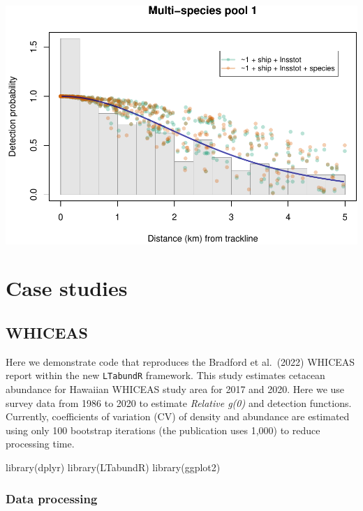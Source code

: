 \documentclass[
]{book}
\newenvironment{Shaded}{\begin{snugshade}}{\end{snugshade}}
\newcommand{\FunctionTok}[1]{\textcolor[rgb]{0.00,0.00,0.00}{#1}}
\newcommand{\NormalTok}[1]{#1}
\begin{document}
\includegraphics{figures/unnamed-chunk-325-1.pdf}

\hypertarget{part-case-studies}{%
\part{Case studies}\label{part-case-studies}}

\hypertarget{whiceas}{%
\chapter{WHICEAS}\label{whiceas}}

Here we demonstrate code that reproduces the Bradford et al.~(2022) WHICEAS report within the new \texttt{LTabundR} framework. This study estimates cetacean abundance for Hawaiian WHICEAS study area for 2017 and 2020. Here we use survey data from 1986 to 2020 to estimate \emph{Relative g(0)} and detection functions. Currently, coefficients of variation (CV) of density and abundance are estimated using only 100 bootstrap iterations (the publication uses 1,000) to reduce processing time.

\begin{Shaded}
\begin{Highlighting}[]
\FunctionTok{library}\NormalTok{(dplyr)}
\FunctionTok{library}\NormalTok{(LTabundR)}
\FunctionTok{library}\NormalTok{(ggplot2)}
\end{Highlighting}
\end{Shaded}

\hypertarget{data-processing}{%
\section*{Data processing}\label{data-processing}}
\end{document}

